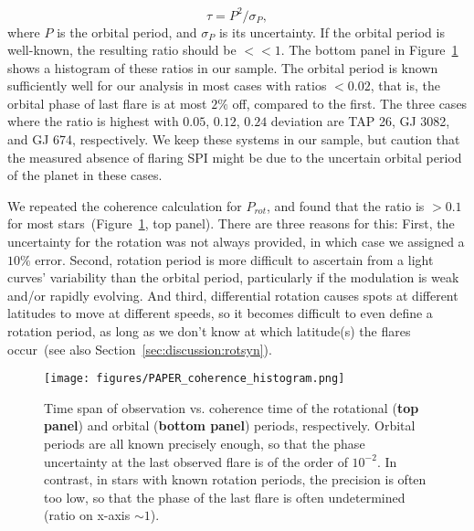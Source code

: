 \documentclass[twocolumn]{aastex631}
\begin{document}
\begin{equation}
    \tau = P^2 / \sigma_P,
\end{equation}
where $P$ is the orbital period, and $\sigma_P$ is its uncertainty.
If the orbital period is well-known, the resulting ratio should be $<<1$. The bottom panel in Figure~\ref{fig:coherence_hist} shows a histogram of these ratios in our sample. The orbital period is known sufficiently well for our analysis in most cases with ratios $<0.02$, that is, the orbital phase of last flare is at most $2\%$ off, compared to the first. The three cases where the ratio is highest with $0.05$, $0.12$, $0.24$ deviation are TAP 26, GJ 3082, and GJ 674, respectively. We keep these systems in our sample, but caution that the measured absence of flaring SPI might be due to the uncertain orbital period of the planet in these cases.

We repeated the coherence calculation for $P_{rot}$, and found that the ratio is $>0.1$ for most stars~(Figure~\ref{fig:coherence_hist}, top panel). There are three reasons for this: First, the uncertainty for the rotation was not always provided, in which case we assigned a $10\%$ error. Second, rotation period is more difficult to ascertain from a light curves' variability than the orbital period, particularly if the modulation is weak and/or rapidly evolving. And third, differential rotation causes spots at different latitudes to move at different speeds, so it becomes difficult to even define a rotation period, as long as we don't know at which latitude(s) the flares occur~(see also Section~\ref{sec:discussion:rotsyn}).

\begin{figure}[ht!]
    \begin{centering}
        \texttt{[image: figures/PAPER\_coherence\_histogram.png]}
        \caption{
           Time span of observation vs. coherence time of the rotational (\textbf{top panel}) and orbital (\textbf{bottom panel}) periods, respectively. Orbital periods are all known precisely enough, so that the phase uncertainty at the last observed flare is of the order of $10^{-2}$. In contrast, in stars with known rotation periods, the precision is often too low, so that the phase of the last flare is often undetermined (ratio on x-axis $\sim 1$).
        }
        \label{fig:coherence_hist}
    \end{centering}
\end{figure}
\end{document}
